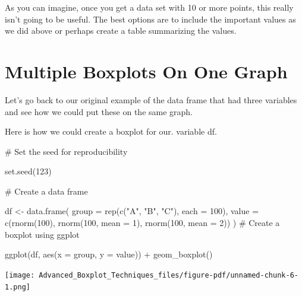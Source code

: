 \documentclass[
  letterpaper,
  DIV=11,
  numbers=noendperiod]{scrreprt}
\newenvironment{Shaded}{\begin{snugshade}}{\end{snugshade}}
\newcommand{\AttributeTok}[1]{\textcolor[rgb]{0.40,0.45,0.13}{#1}}
\newcommand{\CommentTok}[1]{\textcolor[rgb]{0.37,0.37,0.37}{#1}}
\newcommand{\DecValTok}[1]{\textcolor[rgb]{0.68,0.00,0.00}{#1}}
\newcommand{\FunctionTok}[1]{\textcolor[rgb]{0.28,0.35,0.67}{#1}}
\newcommand{\NormalTok}[1]{\textcolor[rgb]{0.00,0.23,0.31}{#1}}
\newcommand{\OtherTok}[1]{\textcolor[rgb]{0.00,0.23,0.31}{#1}}
\newcommand{\SpecialCharTok}[1]{\textcolor[rgb]{0.37,0.37,0.37}{#1}}
\newcommand{\StringTok}[1]{\textcolor[rgb]{0.13,0.47,0.30}{#1}}
\begin{document}
As you can imagine, once you get a data set with 10 or more points, this
really isn't going to be useful. The best options are to include the
important values as we did above or perhaps create a table summarizing
the values.

\section*{Multiple Boxplots On One
Graph}\label{multiple-boxplots-on-one-graph}


Let's go back to our original example of the data frame that had three
variables and see how we could put these on the same graph.

Here is how we could create a boxplot for our. variable df.

\begin{Shaded}
\begin{Highlighting}[]
\CommentTok{\# Set the seed for reproducibility}

\FunctionTok{set.seed}\NormalTok{(}\DecValTok{123}\NormalTok{)}

\CommentTok{\# Create a data frame}

\NormalTok{df }\OtherTok{\textless{}{-}} \FunctionTok{data.frame}\NormalTok{(}
  \AttributeTok{group =} \FunctionTok{rep}\NormalTok{(}\FunctionTok{c}\NormalTok{(}\StringTok{"A"}\NormalTok{, }\StringTok{"B"}\NormalTok{, }\StringTok{"C"}\NormalTok{), }\AttributeTok{each =} \DecValTok{100}\NormalTok{),}
  \AttributeTok{value =} \FunctionTok{c}\NormalTok{(}\FunctionTok{rnorm}\NormalTok{(}\DecValTok{100}\NormalTok{), }\FunctionTok{rnorm}\NormalTok{(}\DecValTok{100}\NormalTok{, }\AttributeTok{mean =} \DecValTok{1}\NormalTok{), }\FunctionTok{rnorm}\NormalTok{(}\DecValTok{100}\NormalTok{, }\AttributeTok{mean =} \DecValTok{2}\NormalTok{))}
\NormalTok{)}
\CommentTok{\# Create a boxplot using ggplot}

\FunctionTok{ggplot}\NormalTok{(df, }\FunctionTok{aes}\NormalTok{(}\AttributeTok{x =}\NormalTok{ group, }\AttributeTok{y =}\NormalTok{ value)) }\SpecialCharTok{+}
  \FunctionTok{geom\_boxplot}\NormalTok{()}
\end{Highlighting}
\end{Shaded}

\begin{center}
\texttt{[image: Advanced\_Boxplot\_Techniques\_files/figure-pdf/unnamed-chunk-6-1.png]}
\end{center}
\end{document}

